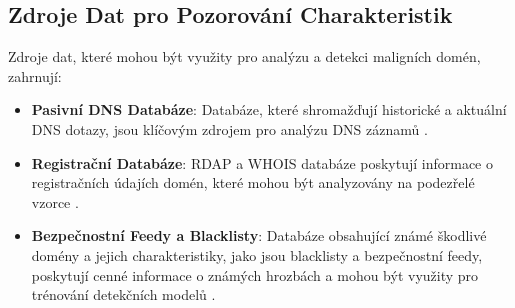 \subsection{Zdroje Dat pro Pozorování Charakteristik}
Zdroje dat, které mohou být využity pro analýzu a detekci maligních domén, zahrnují:

\begin{itemize}
\item \textbf{Pasivní DNS Databáze}: Databáze, které shromažďují historické a aktuální DNS dotazy, jsou klíčovým zdrojem pro analýzu DNS záznamů \cite{silveira2021detection}.

\item \textbf{Registrační Databáze}: RDAP a WHOIS databáze poskytují informace o registračních údajích domén, které mohou být analyzovány na podezřelé vzorce \cite{zhu2020detecting}.

\item \textbf{Bezpečnostní Feedy a Blacklisty}: Databáze obsahující známé škodlivé domény a jejich charakteristiky, jako jsou blacklisty a bezpečnostní feedy, poskytují cenné informace o známých hrozbách a mohou být využity pro trénování detekčních modelů \cite{max2020madmax}.

\end{itemize}